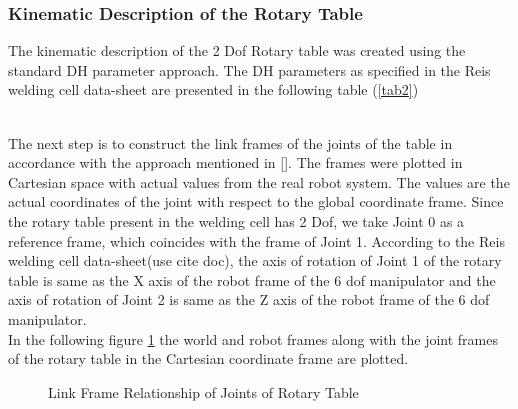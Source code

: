 \subsubsection{Kinematic Description of the Rotary Table}

The kinematic description of the 2 Dof Rotary table was created using the standard DH parameter approach. The DH parameters as specified in the Reis welding cell data-sheet are presented in the following table (\ref{tab2})
\begin{table}[!htbp]
\centering
{}
\caption{DH parameter of Rotary Table}
\label{tab2}
\end{table}
\\
The next step is to construct the link frames of the joints of the table in accordance with the approach mentioned in [\citet{craig2005introduction}]. The frames were plotted in Cartesian space with actual values from the real robot system. The values are the actual coordinates of the joint with respect to the global coordinate frame. Since the rotary table present in the welding cell has 2 Dof, we take Joint 0 as a reference frame, which coincides with the frame of Joint 1. According to the Reis welding cell data-sheet(use cite doc), the axis of rotation of Joint 1 of the rotary table is same as the X axis of the robot frame of the 6 dof manipulator and the axis of rotation of Joint 2 is same as the Z axis of the robot frame of the 6 dof manipulator. \\
In the following figure \ref{fig:img12} the world and robot frames along with the joint frames of the rotary table in the Cartesian coordinate frame are plotted. 
\begin{figure}[!htbp] %
 \centering
   \caption{Link Frame Relationship of Joints of Rotary Table}  
\label{fig:img12}
\end{figure}

